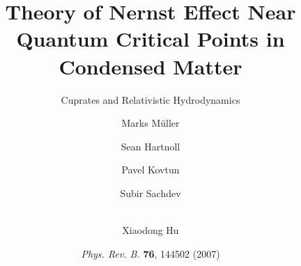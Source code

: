 \documentclass[10pt,aspectratio=43,xcolor=x11names,t]{beamer}%
\begin{document}
\title[Nernst Effect near QCP]{Theory of Nernst Effect Near Quantum Critical Points in Condensed Matter}
\subtitle{Cuprates and Relativistic Hydrodynamics}
\author[Xiaodong Hu]{Marks M\"{u}ller \and Sean Hartnoll \and Pavel Kovtun \and Subir Sachdev\and \\[1em] Xiaodong Hu }



\date{\color{red}\textit{Phys. Rev. B.} \textbf{76}, 144502 (2007)}


\begin{frame}%
	\titlepage
\end{frame}


\end{document}
